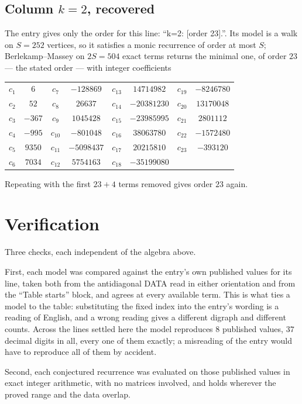 \documentclass[11pt,a4paper]{article}
\theoremstyle{plain}
\theoremstyle{definition}
\begin{document}
\subsection*{Column $k=2$, recovered}
The entry gives only the order for this line: ``k=2: [order 23].''. Its model is a walk on
$S=252$ vertices, so it satisfies a monic recurrence of order at most $S$;
Berlekamp--Massey on $2S=504$ exact terms returns the minimal one, of order
$23$ --- the stated order --- with integer coefficients
\begin{center}\small\begin{tabular}{cccccccc}
$c_{1}$ & $6$ & $c_{7}$ & $-128869$ & $c_{13}$ & $14714982$ & $c_{19}$ & $-8246780$ \\
$c_{2}$ & $52$ & $c_{8}$ & $26637$ & $c_{14}$ & $-20381230$ & $c_{20}$ & $13170048$ \\
$c_{3}$ & $-367$ & $c_{9}$ & $1045428$ & $c_{15}$ & $-23985995$ & $c_{21}$ & $2801112$ \\
$c_{4}$ & $-995$ & $c_{10}$ & $-801048$ & $c_{16}$ & $38063780$ & $c_{22}$ & $-1572480$ \\
$c_{5}$ & $9350$ & $c_{11}$ & $-5098437$ & $c_{17}$ & $20215810$ & $c_{23}$ & $-393120$ \\
$c_{6}$ & $7034$ & $c_{12}$ & $5754163$ & $c_{18}$ & $-35199080$ &  &  \\
\end{tabular}\end{center}
Repeating with the first $23+4$ terms removed gives order $23$ again.

\section{Verification}

Three checks, each independent of the algebra above.

First, each model was compared against the entry's own published values for its line, taken
both from the antidiagonal DATA read in either orientation and from the ``Table starts''
block, and agrees at every available term. This is what ties a model to the table:
substituting the fixed index into the entry's wording is a reading of English, and a wrong
reading gives a different digraph and different counts. Across the lines settled here the
model reproduces $8$ published values, $37$ decimal digits in all, every one of
them exactly; a misreading of the entry would have to reproduce all of them by accident.

Second, each conjectured recurrence was evaluated on those published values in exact
integer arithmetic, with no matrices involved, and holds wherever the proved range and the
data overlap.
\end{document}
